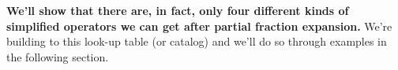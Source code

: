 \documentclass{report}
\begin{document}
\textbf{We'll show that there are, in fact, only four different kinds of simplified operators we can get after partial fraction expansion.} We're building to this look-up table (or catalog) and we'll do so through examples in the following section. \smallskip \\




















\end{document}
